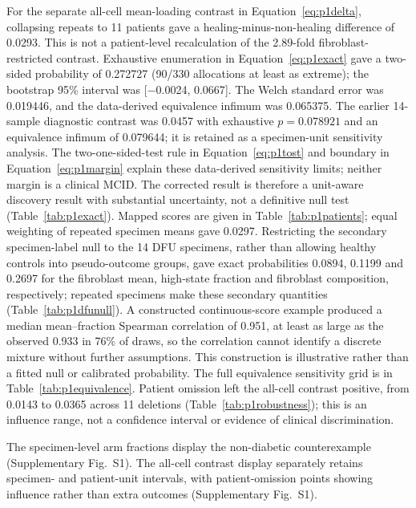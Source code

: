 \documentclass[10pt,a4paper]{article}
\begin{document}
For the separate all-cell mean-loading contrast in Equation~\eqref{eq:p1delta}, collapsing repeats to 11 patients gave a healing-minus-non-healing difference of 0.0293. This is not a patient-level recalculation of the 2.89-fold fibroblast-restricted contrast. Exhaustive enumeration in Equation~\eqref{eq:p1exact} gave a two-sided probability of 0.272727 (90/330 allocations at least as extreme); the bootstrap 95\% interval was {[}−0.0024, 0.0667{]}. The Welch standard error was 0.019446, and the data-derived equivalence infimum was 0.065375. The earlier 14-sample diagnostic contrast was 0.0457 with exhaustive $p=0.078921$ and an equivalence infimum of 0.079644; it is retained as a specimen-unit sensitivity analysis. The two-one-sided-test rule in Equation~\eqref{eq:p1tost} and boundary in Equation~\eqref{eq:p1margin} explain these data-derived sensitivity limits; neither margin is a clinical MCID. The corrected result is therefore a unit-aware discovery result with substantial uncertainty, not a definitive null test (Table~\ref{tab:p1exact}). Mapped scores are given in Table~\ref{tab:p1patients}; equal weighting of repeated specimen means gave 0.0297. Restricting the secondary specimen-label null to the 14 DFU specimens, rather than allowing healthy controls into pseudo-outcome groups, gave exact probabilities 0.0894, 0.1199 and 0.2697 for the fibroblast mean, high-state fraction and fibroblast composition, respectively; repeated specimens make these secondary quantities (Table~\ref{tab:p1dfunull}). A constructed continuous-score example produced a median mean--fraction Spearman correlation of 0.951, at least as large as the observed 0.933 in 76\% of draws, so the correlation cannot identify a discrete mixture without further assumptions. This construction is illustrative rather than a fitted null or calibrated probability. The full equivalence sensitivity grid is in Table~\ref{tab:p1equivalence}. Patient omission left the all-cell contrast positive, from 0.0143 to 0.0365 across 11 deletions (Table~\ref{tab:p1robustness}); this is an influence range, not a confidence interval or evidence of clinical discrimination.

The specimen-level arm fractions display the non-diabetic counterexample (Supplementary Fig.~S1\label{call:p1f4}). The all-cell contrast display separately retains specimen- and patient-unit intervals, with patient-omission points showing influence rather than extra outcomes (Supplementary Fig.~S1).
\end{document}
